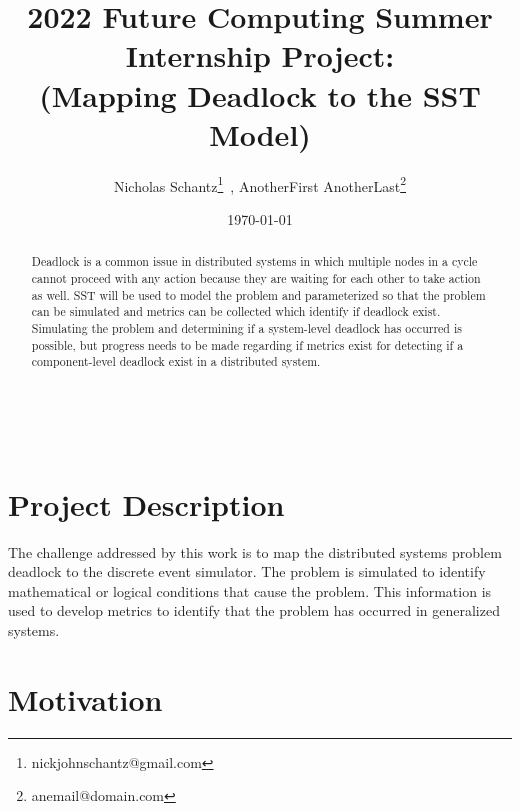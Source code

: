 \documentclass{article}
\begin{document}
    \begin{minipage}[h]{\textwidth}
        \title{2022 Future Computing Summer Internship Project:\\(Mapping Deadlock to the SST Model)}
        \author{Nicholas Schantz\footnote{nickjohnschantz@gmail.com}\ , 
        AnotherFirst AnotherLast\footnote{anemail@domain.com}}
        \date{\today}
            \maketitle
        \begin{abstract}
            Deadlock is a common issue in distributed systems in which multiple nodes in a cycle cannot proceed with any action because they are waiting for each other to take action as well. SST will be used to model the problem and parameterized so that the problem can be simulated and metrics can be collected which identify if deadlock exist. Simulating the problem and determining if a system-level deadlock has occurred is possible, but progress needs to be made regarding if metrics exist for detecting if a component-level deadlock exist in a distributed system.
        \end{abstract}
    \end{minipage}

\ \\


\section{Project Description} %

The challenge addressed by this work is to map the distributed systems problem deadlock to the discrete event simulator. The problem is simulated to identify mathematical or logical conditions that cause the problem. This information is used to develop metrics to identify that the problem has occurred in generalized systems.

\section{Motivation} %
\end{document}
